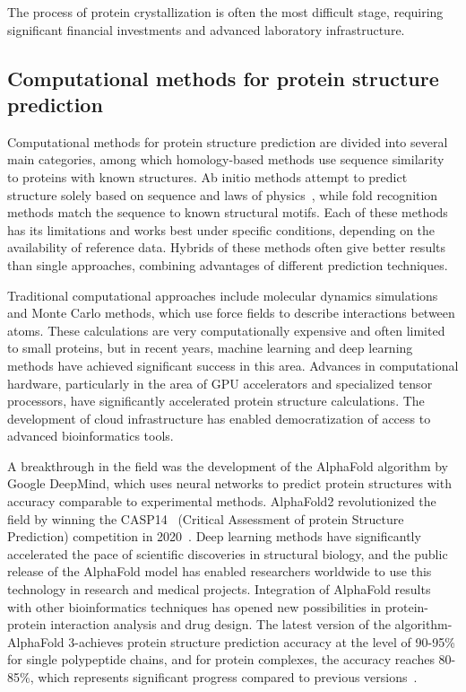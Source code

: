 The process of protein crystallization is often the most difficult stage, requiring significant financial investments and advanced laboratory infrastructure.

\subsection{Computational methods for protein structure prediction}
Computational methods for protein structure prediction are divided into several main categories, among which homology-based methods use sequence similarity to proteins with known structures.
Ab initio methods attempt to predict structure solely based on sequence and laws of physics~\cite{ab_initio_protein_folding}, while fold recognition methods match the sequence to known structural motifs.
Each of these methods has its limitations and works best under specific conditions, depending on the availability of reference data.
Hybrids of these methods often give better results than single approaches, combining advantages of different prediction techniques.

Traditional computational approaches include molecular dynamics simulations and Monte Carlo methods, which use force fields to describe interactions between atoms.
These calculations are very computationally expensive and often limited to small proteins, but in recent years, machine learning and deep learning methods have achieved significant success in this area.
Advances in computational hardware, particularly in the area of GPU accelerators and specialized tensor processors, have significantly accelerated protein structure calculations.
The development of cloud infrastructure has enabled democratization of access to advanced bioinformatics tools.

A breakthrough in the field was the development of the AlphaFold algorithm by Google DeepMind, which uses neural networks to predict protein structures with accuracy comparable to experimental methods.
AlphaFold2 revolutionized the field by winning the CASP14~\cite{casp} (Critical Assessment of protein Structure Prediction) competition in 2020~\cite{alphafold2}.
Deep learning methods have significantly accelerated the pace of scientific discoveries in structural biology, and the public release of the AlphaFold model has enabled researchers worldwide to use this technology in research and medical projects.
Integration of AlphaFold results with other bioinformatics techniques has opened new possibilities in protein-protein interaction analysis and drug design.
The latest version of the algorithm-AlphaFold 3-achieves protein structure prediction accuracy at the level of 90-95\% for single polypeptide chains, and for protein complexes, the accuracy reaches 80-85\%, which represents significant progress compared to previous versions~\cite{alphafold3}.


